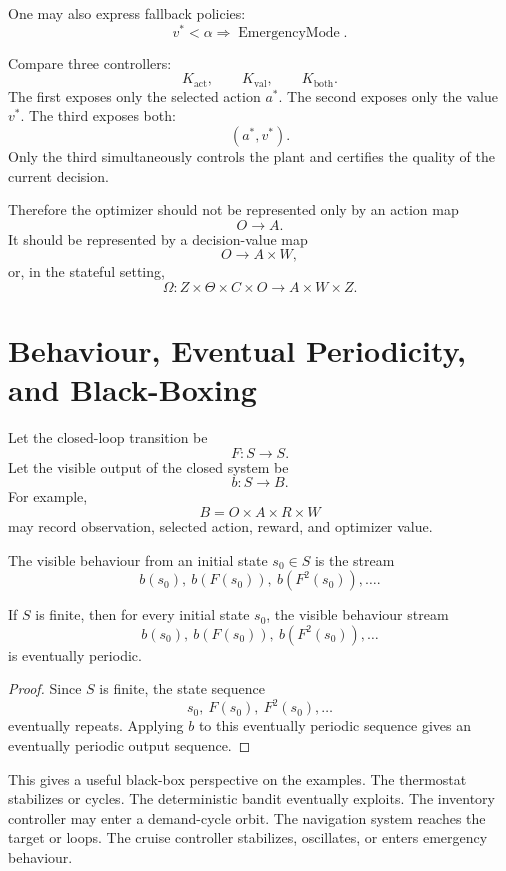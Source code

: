 One may also express fallback policies:
\[
v^*<\alpha
\Longrightarrow
\operatorname{EmergencyMode}.
\]

Compare three controllers:
\[
K_{\operatorname{act}},
\qquad
K_{\operatorname{val}},
\qquad
K_{\operatorname{both}}.
\]
The first exposes only the selected action \(a^*\).  The second exposes only the value \(v^*\).  The
third exposes both:
\[
(a^*,v^*).
\]
Only the third simultaneously controls the plant and certifies the quality of the current decision.

Therefore the optimizer should not be represented only by an action map
\[
O\longrightarrow A.
\]
It should be represented by a decision-value map
\[
O\longrightarrow A\times W,
\]
or, in the stateful setting,
\[
\Omega:Z\times\Theta\times C\times O\longrightarrow A\times W\times Z.
\]

\section{Behaviour, Eventual Periodicity, and Black-Boxing}
\label{sec:cybernetic-behaviour-black-boxing}

Let the closed-loop transition be
\[
F:S\longrightarrow S.
\]
Let the visible output of the closed system be
\[
b:S\longrightarrow B.
\]
For example,
\[
B=O\times A\times R\times W
\]
may record observation, selected action, reward, and optimizer value.

The visible behaviour from an initial state \(s_0\in S\) is the stream
\[
b(s_0),\ b(F(s_0)),\ b(F^2(s_0)),\ldots.
\]

\begin{proposition}
\label{prop:eventually-periodic-visible-behaviour}
If \(S\) is finite, then for every initial state \(s_0\), the visible behaviour stream
\[
b(s_0),\ b(F(s_0)),\ b(F^2(s_0)),\ldots
\]
is eventually periodic.
\end{proposition}

\begin{proof}
Since \(S\) is finite, the state sequence
\[
s_0,\ F(s_0),\ F^2(s_0),\ldots
\]
eventually repeats.  Applying \(b\) to this eventually periodic sequence gives an eventually
periodic output sequence.
\end{proof}

This gives a useful black-box perspective on the examples.  The thermostat stabilizes or cycles.
The deterministic bandit eventually exploits.  The inventory controller may enter a demand-cycle
orbit.  The navigation system reaches the target or loops.  The cruise controller stabilizes,
oscillates, or enters emergency behaviour.

